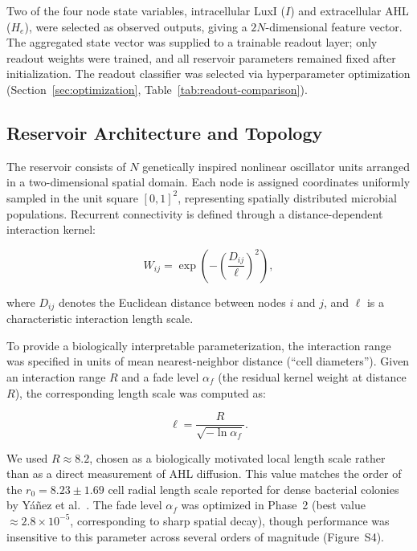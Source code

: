 \documentclass[journal=asbcd6,manuscript=article,keywords]{achemso}
\begin{document}
Two of the four node state variables, intracellular LuxI ($I$) and extracellular AHL ($H_e$), were selected as observed outputs, giving a $2N$-dimensional feature vector.
The aggregated state vector was supplied to a trainable readout layer; only readout weights were trained, and all reservoir parameters remained fixed after initialization.
The readout classifier was selected via hyperparameter optimization (Section~\ref{sec:optimization}, Table~\ref{tab:readout-comparison}).

\subsection{Reservoir Architecture and Topology}
The reservoir consists of $N$ genetically inspired nonlinear oscillator units arranged in a two-dimensional spatial domain. 
Each node is assigned coordinates uniformly sampled in the unit square $[0,1]^2$, representing spatially distributed microbial populations. 
Recurrent connectivity is defined through a distance-dependent interaction kernel:

\begin{equation}
W_{ij} = \exp\!\left(-\left(\frac{D_{ij}}{\ell}\right)^2\right),
\end{equation}

where $D_{ij}$ denotes the Euclidean distance between nodes $i$ and $j$, and $\ell$ is a characteristic interaction length scale.

To provide a biologically interpretable parameterization, the interaction range was specified in units of mean nearest-neighbor distance (``cell diameters''). 
Given an interaction range $R$ and a fade level $\alpha_f$ (the residual kernel weight at distance $R$), the corresponding length scale was computed as:

\begin{equation}
\ell = \frac{R}{\sqrt{-\ln \alpha_f}}.
\end{equation}

We used $R \approx 8.2$, chosen as a biologically motivated local length scale rather than as a direct measurement of AHL diffusion. 
This value matches the order of the $r_0 = 8.23 \pm 1.69$ cell radial length scale reported for dense bacterial colonies by Y\'a\~nez et al.~\cite{Yanez2020}.
The fade level $\alpha_f$ was optimized in Phase~2 (best value $\approx 2.8 \times 10^{-5}$, corresponding to sharp spatial decay), though performance was insensitive to this parameter across several orders of magnitude (Figure~S4).
\end{document}

